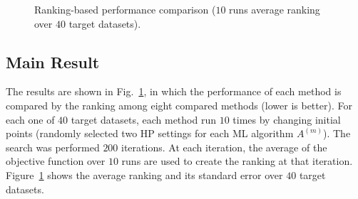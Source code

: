 \begin{figure}[t]
 \centering
 \caption{
 Ranking-based performance comparison ($10$ runs average ranking over $40$ target datasets). 
 }
 \label{fig:iteration}
\end{figure}

\subsection{Main Result}
\label{ssec:experimental_result}

The results are shown in Fig.~\ref{fig:iteration}, in which the performance of each method is compared by the ranking among eight compared methods (lower is better).
%
For each one of $40$ target datasets, each method run $10$ times by changing initial points (randomly selected two HP settings for each ML algorithm $A^{(m)}$).
%
The search was performed $200$ iterations. 
%
At each iteration, the average of the objective function  over $10$ runs are used to create the ranking at that iteration.
%
Figure~\ref{fig:iteration} shows the average ranking and its standard error over $40$ target datasets.



